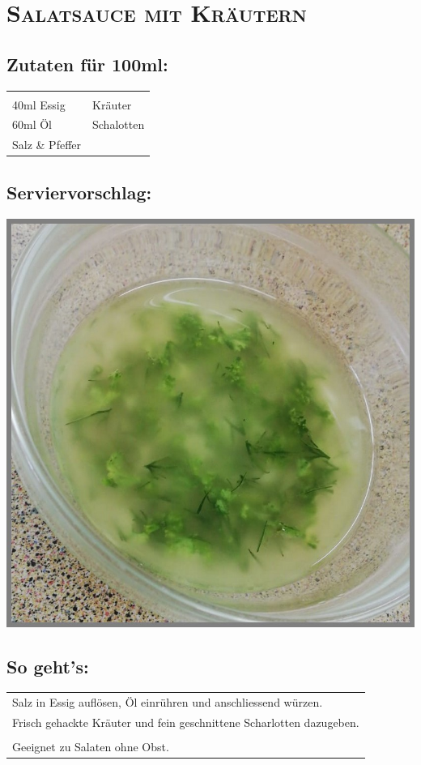 \section{\textsc{Salatsauce mit Kräutern}}

\subsection*{Zutaten für 100ml:}

\begin{tabular}{p{7.5cm} p{7.5cm}}
	& \\
	40ml Essig & Kräuter \\
	60ml Öl & Schalotten \\
	Salz \& Pfeffer &
\end{tabular}

\subsection*{Serviervorschlag:}

\includegraphics[width=\textwidth]{img/d_krauter.jpeg} \cite{dkrauter}

\subsection*{So geht's:}

\begin{tabular}{p{15cm}}
	\\
	Salz in Essig auflösen, Öl einrühren und anschliessend würzen.\\
	Frisch gehackte Kräuter und fein geschnittene Scharlotten dazugeben.\\
	\\
	Geeignet zu Salaten ohne Obst.
\end{tabular}
